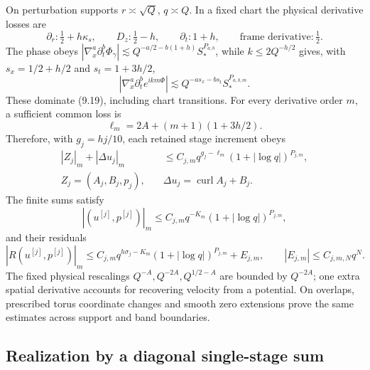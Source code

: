 \documentclass[10pt,a4paper]{article}
\begin{document}
On perturbation supports $r\asymp\sqrt Q$, $q\asymp Q$. In a fixed chart the
physical derivative losses are
\[
 \partial_r:\tfrac12+h\kappa_s,\qquad D_z:\tfrac12-h,\qquad
 \partial_t:1+h,\qquad \text{frame derivative}:\tfrac12 .              \tag{9.19}
\]
The phase obeys
$|\nabla_x^a\partial_t^b\Phi_\gamma|\lesssim
Q^{-a/2-b(1+h)}S_*^{P_{a,b}}$, while $k\le2Q^{-h/2}$ gives, with
$s_x=1/2+h/2$ and $s_t=1+3h/2$,
\[
 |\nabla_x^a\partial_t^b e^{ikm\Phi}|\lesssim
 Q^{-as_x-bs_t}S_*^{P_{a,b,m}} .                                  \tag{9.19a}
\]
These dominate (9.19), including chart transitions.  For every derivative order
$m$, a sufficient common loss is
\[
 \ell_m=2A+(m+1)(1+3h/2).
\]
Therefore, with $g_j=hj/10$, each retained stage increment obeys
\begin{equation}
 \begin{aligned}
 |Z_j|_m+|\Delta u_j|_m&\le C_{j,m}q^{g_j-\ell_m}(1+|\log q|)^{P_{j,m}},\\
 Z_j=(A_j,B_j,p_j),\quad &\Delta u_j=\operatorname{curl}A_j+B_j .
 \end{aligned}\tag{9.17}
\end{equation}
The finite sums satisfy
\[
 |(u^{[j]},p^{[j]})|_m\le C_{j,m}q^{-K_m}(1+|\log q|)^{P_{j,m}},
\]
and their residuals
\begin{equation}
 |R(u^{[j]},p^{[j]})|_m\le C_{j,m}q^{h\sigma_j-K_m}(1+|\log q|)^{P_{j,m}}+E_{j,m},
 \qquad |E_{j,m}|\le C_{j,m,N}q^N .                                 \tag{9.18}
\end{equation}
The fixed physical rescalings $Q^{-A},Q^{-2A},Q^{1/2-A}$ are bounded by
$Q^{-2A}$; one extra spatial derivative accounts for recovering velocity from a
potential.  On overlaps, prescribed torus coordinate changes and smooth zero
extensions prove the same estimates across support and band boundaries.

\subsection{Realization by a diagonal single-stage sum}
\label{subsec:stage9-realization}
\end{document}
